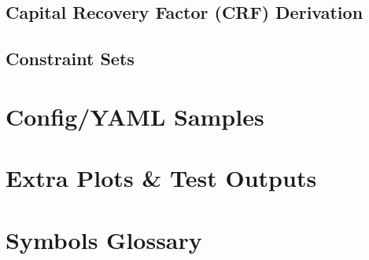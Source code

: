 \subsection{Capital Recovery Factor (CRF) Derivation}

\subsection{Constraint Sets}

\section{Config/YAML Samples}

\section{Extra Plots \& Test Outputs}

\section{Symbols Glossary}
